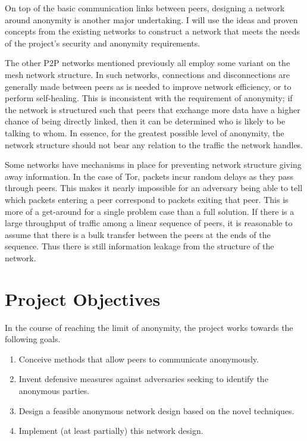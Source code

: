 \documentclass[ %
                    author={Luke Murray},
                supervisor={Dr. Simon Hollis},
                     title={Shadow Peer-to-Peer Networks},
                  subtitle={},
                    degree={MEng},
                      year={2013} ]{thesis}
\begin{document}
On top of the basic communication links between peers, designing a network around anonymity is another major undertaking. I will use the ideas and proven concepts from the existing networks to construct a network that meets the needs of the project's security and anonymity requirements.

The other P2P networks mentioned previously all employ some variant on the mesh network structure. In such networks, connections and disconnections are generally made between peers as is needed to improve network efficiency, or to perform self-healing. This is inconsistent with the requirement of anonymity; if the network is structured such that peers that exchange more data have a higher chance of being directly linked, then it can be determined who is likely to be talking to whom. In essence, for the greatest possible level of anonymity, the network structure should not bear any relation to the traffic the network handles.

Some networks have mechanisms in place for preventing network structure giving away information. In the case of Tor, packets incur random delays as they pass through peers. This makes it nearly impossible for an adversary being able to tell which packets entering a peer correspond to packets exiting that peer. This is more of a get-around for a single problem case than a full solution. If there is a large throughput of traffic among a linear sequence of peers, it is reasonable to assume that there is a bulk transfer between the peers at the ends of the sequence. Thus there is still information leakage from the structure of the network.

\section{Project Objectives}

In the course of reaching the limit of anonymity, the project works towards the following goals. 

\begin{enumerate}
\item Conceive methods that allow peers to communicate anonymously.
\item Invent defensive measures against adversaries seeking to identify the anonymous parties.
\item Design a feasible anonymous network design based on the novel techniques.
\item Implement (at least partially) this network design.
\end{enumerate}
\end{document}
